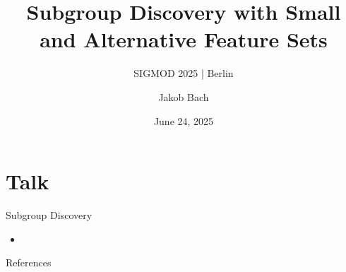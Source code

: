 \documentclass[en, navbaroff, handout]{sdqbeamer}
\title[Subgroup Discovery with Small and Alternative Feature Sets]{Subgroup Discovery with Small and Alternative Feature Sets} %
\subtitle{SIGMOD 2025 | Berlin}
\author[Jakob Bach]{Jakob Bach} %
\date[2025-06-24]{June 24, 2025} %
\begin{document}
\begin{frame}[title white horizontal, kitlogo=rgb]
	\titlepage
\end{frame}

\section{Talk}

\begin{frame}[t]{Subgroup Discovery}
	\begin{itemize}
		\item
	\end{itemize}
\end{frame}

\appendix
\beginbackup %

\begin{frame}[t, allowframebreaks]{References}
	\printbibliography
\end{frame}

\backupend
\end{document}
